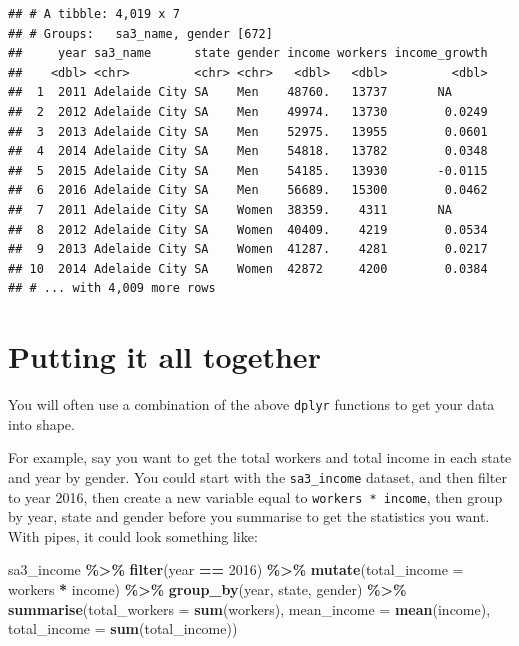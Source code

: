 \documentclass[
]{book}
\newenvironment{Shaded}{\begin{snugshade}}{\end{snugshade}}
\newcommand{\DataTypeTok}[1]{\textcolor[rgb]{0.13,0.29,0.53}{#1}}
\newcommand{\DecValTok}[1]{\textcolor[rgb]{0.00,0.00,0.81}{#1}}
\newcommand{\KeywordTok}[1]{\textcolor[rgb]{0.13,0.29,0.53}{\textbf{#1}}}
\newcommand{\NormalTok}[1]{#1}
\newcommand{\OperatorTok}[1]{\textcolor[rgb]{0.81,0.36,0.00}{\textbf{#1}}}
\newcommand{\StringTok}[1]{\textcolor[rgb]{0.31,0.60,0.02}{#1}}
\begin{document}
\begin{verbatim}
## # A tibble: 4,019 x 7
## # Groups:   sa3_name, gender [672]
##     year sa3_name      state gender income workers income_growth
##    <dbl> <chr>         <chr> <chr>   <dbl>   <dbl>         <dbl>
##  1  2011 Adelaide City SA    Men    48760.   13737       NA     
##  2  2012 Adelaide City SA    Men    49974.   13730        0.0249
##  3  2013 Adelaide City SA    Men    52975.   13955        0.0601
##  4  2014 Adelaide City SA    Men    54818.   13782        0.0348
##  5  2015 Adelaide City SA    Men    54185.   13930       -0.0115
##  6  2016 Adelaide City SA    Men    56689.   15300        0.0462
##  7  2011 Adelaide City SA    Women  38359.    4311       NA     
##  8  2012 Adelaide City SA    Women  40409.    4219        0.0534
##  9  2013 Adelaide City SA    Women  41287.    4281        0.0217
## 10  2014 Adelaide City SA    Women  42872     4200        0.0384
## # ... with 4,009 more rows
\end{verbatim}

\hypertarget{putting-it-all-together}{%
\section{Putting it all together}\label{putting-it-all-together}}

You will often use a combination of the above \texttt{dplyr} functions to get your data into shape.

For example, say you want to get the total workers and total income in each state and year by gender. You could start with the \texttt{sa3\_income} dataset, and then filter to year 2016, then create a new variable equal to \texttt{workers\ *\ income}, then group by year, state and gender before you summarise to get the statistics you want. With pipes, it could look something like:

\begin{Shaded}
\begin{Highlighting}[]
\NormalTok{sa3\_income }\OperatorTok{\%\textgreater{}\%}\StringTok{ }
\StringTok{  }\KeywordTok{filter}\NormalTok{(year }\OperatorTok{==}\StringTok{ }\DecValTok{2016}\NormalTok{) }\OperatorTok{\%\textgreater{}\%}\StringTok{ }
\StringTok{  }\KeywordTok{mutate}\NormalTok{(}\DataTypeTok{total\_income =}\NormalTok{ workers }\OperatorTok{*}\StringTok{ }\NormalTok{income) }\OperatorTok{\%\textgreater{}\%}\StringTok{ }
\StringTok{  }\KeywordTok{group\_by}\NormalTok{(year, state, gender) }\OperatorTok{\%\textgreater{}\%}\StringTok{ }
\StringTok{  }\KeywordTok{summarise}\NormalTok{(}\DataTypeTok{total\_workers =} \KeywordTok{sum}\NormalTok{(workers),}
            \DataTypeTok{mean\_income =} \KeywordTok{mean}\NormalTok{(income),}
            \DataTypeTok{total\_income =} \KeywordTok{sum}\NormalTok{(total\_income))}
\end{Highlighting}
\end{Shaded}
\end{document}
